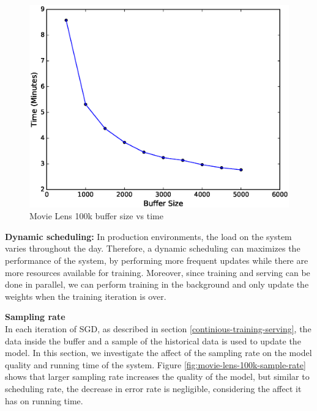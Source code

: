 \documentclass{sig-alternate-05-2015}
\begin{document}
\begin{figure}[H]
\centering
\includegraphics[width=\columnwidth]{../images/experiment-results/movie-lens-100k-buffer-time.eps}
\caption{Movie Lens 100k buffer size vs time}
\label{fig:movie-lens-100k-buffer-size-time}
\end{figure}

\textbf{Dynamic scheduling:} In production environments, the load on the system varies throughout the day. 
Therefore, a dynamic scheduling can maximizes the performance of the system, by performing more frequent updates while there are more resources available for training. 
Moreover, since training and serving can be done in parallel, we can perform training in the background and only update the weights when the training iteration is over. 

\textbf{Sampling rate}\\
In each iteration of SGD, as described in section \ref{continious-training-serving}, the data inside the buffer and a sample of the historical data is used to update the model.
In this section, we investigate the affect of the sampling rate on the model quality and running time of the system.
Figure \ref{fig:movie-lens-100k-sample-rate} shows that larger sampling rate increases the quality of the model, but similar to scheduling rate, the decrease in error rate is negligible, considering the affect it has on running time. 
 
\end{document}
